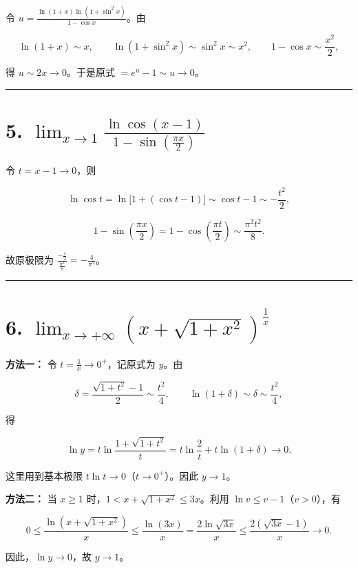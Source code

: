 \documentclass[11pt,a4paper,fontset=windows]{ctexart}
\begin{document}
令 \(\displaystyle u=\frac{\ln(1+x)\ln(1+\sin^2x)}{1-\cos x}\)。由

\[
\ln(1+x)\sim x,\qquad
\ln(1+\sin^2x)\sim\sin^2x\sim x^2,\qquad
1-\cos x\sim\frac{x^2}{2},
\]

得 \(u\sim2x\to0\)。于是原式 \(=e^u-1\sim u\to\boxed{0}\)。

\par{}\vspace{0.5em}\hrule\vspace{0.2em}
\section*{5. \(\displaystyle\lim_{x\to1}\frac{\ln\cos(x-1)}{1-\sin(\frac{\pi x}{2})}\)}

令 \(t=x-1\to0\)，则

\[
\ln\cos t=\ln\bigl[1+(\cos t-1)\bigr]
\sim\cos t-1\sim-\frac{t^2}{2},
\]

\[
1-\sin(\frac{\pi x}{2})=1-\cos(\frac{\pi t}{2})
\sim\frac{\pi^2t^2}{8}.
\]

故原极限为 \(\displaystyle\frac{-\frac{1}{2}}{\frac{\pi^2}{8}}=\boxed{-\frac4{\pi^2}}\)。

\par{}\vspace{0.5em}\hrule\vspace{0.2em}
\section*{6. \(\displaystyle\lim_{x\to+\infty}\left(x+\sqrt{1+x^2}\right)^{\frac{1}{x}}\)}

\textbf{方法一：} 令 \(t=\frac{1}{x}\to0^+\)，记原式为 \(y\)。由

\[
\delta=\frac{\sqrt{1+t^2}-1}{2}\sim\frac{t^2}{4},\qquad
\ln(1+\delta)\sim\delta\sim\frac{t^2}{4},
\]

得

\[
\ln y=t\ln\frac{1+\sqrt{1+t^2}}{t}
=t\ln\frac2t+t\ln(1+\delta)\longrightarrow0.
\]

这里用到基本极限 \(t\ln t\to0\)（\(t\to0^+\)）。因此 \(y\to\boxed{1}\)。

\textbf{方法二：} 当 \(x\ge1\) 时，\(1<x+\sqrt{1+x^2}\le3x\)。利用 \(\ln v\le v-1\)（\(v>0\)），有

\[
0\le\frac{\ln(x+\sqrt{1+x^2})}{x}
\le\frac{\ln(3x)}{x}
=\frac{2\ln\sqrt{3x}}{x}
\le\frac{2(\sqrt{3x}-1)}{x}\longrightarrow0.
\]

因此，\(\ln y\to0\)，故 \(y\to\boxed{1}\)。
\end{document}
